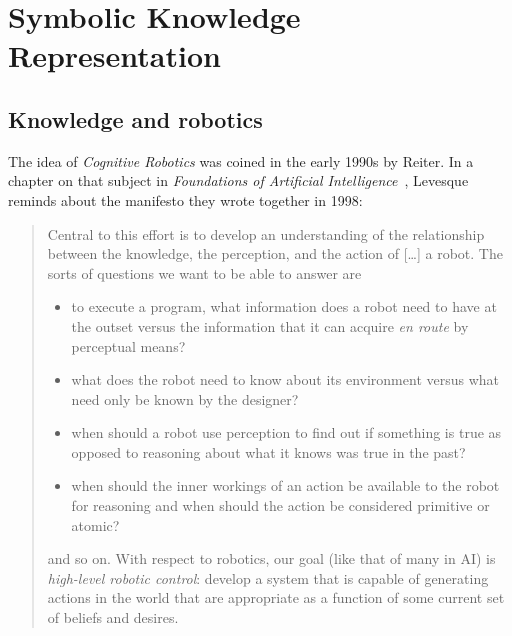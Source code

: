 \chapter{Symbolic Knowledge Representation}
\label{chapt|krs}


\section{Knowledge and robotics}
\label{sect|knowledge}

The idea of \emph{Cognitive Robotics} was coined in the early 1990s by Reiter.
In a chapter on that subject in \emph{Foundations of Artificial
Intelligence}~\cite{Levesque2008}, Levesque reminds about the manifesto they
wrote together in 1998:

\begin{quotation}

    Central to this effort is to develop an understanding of the relationship
    between the knowledge, the perception, and the action of [\ldots] a robot. The
    sorts of questions we want to be able to answer are

    \begin{itemize} 

        \item to execute a program, what information does a robot need to have
        at the outset versus the information that it can acquire \emph{en route}
        by perceptual means?

        \item what does the robot need to know about its environment versus what
        need only be known by the designer?

        \item when should a robot use perception to find out if something is
        true as opposed to reasoning about what it knows was true in the past?

        \item when should the inner workings of an action be available to the
        robot for reasoning and when should the action be considered primitive
        or atomic?

    \end{itemize}

    and so on. With respect to robotics, our goal (like that of many in AI) is
    \emph{high-level robotic control}: develop a system that is capable of
    generating actions in the world that are appropriate as a function of some
    current set of beliefs and desires.

\end{quotation}

